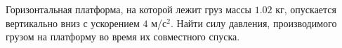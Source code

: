 Горизонтальная платформа, на которой лежит груз массы $1.02$ кг,
опускается вертикально вниз с ускорением $4$ м/с$^2$. Найти силу
давления, производимого грузом на платформу во время их совместного
спуска.
